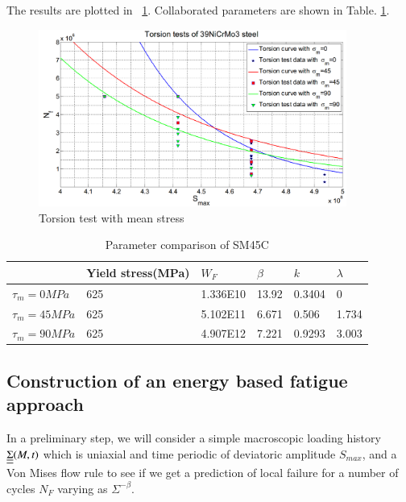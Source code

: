 \documentclass[3p,times,procedia,number]{elsarticle}
\newcommand{\figref}[1]{\figurename~\ref{#1}}
\begin{document}
The results are plotted in \figref{torsionSN}. Collaborated parameters are shown in Table. \ref{mean39NiCrMo3}.
\begin{figure}[h!]
	\centering
	\includegraphics[width=0.9\textwidth]{figures//torsionSN.png} 
	\caption{Torsion test with mean stress}
	\label{torsionSN}
\end{figure}
\begin{table}[]
	\centering
	\caption{Parameter comparison of SM45C}
	\label{mean39NiCrMo3}
	\begin{tabular}{l|lllll}
		\hline
		& \textbf{Yield stress(MPa)} & \textbf{$W_F$}                  & \textbf{$\beta$} & \textbf{$k$} & \textbf{$\lambda$} \\ \hline
		\textbf{$\tau_m=0MPa$}                         & 625                        & 1.336E10                        & 13.92            & 0.3404       & 0                 \\
		{\color[HTML]{333333} \textbf{$\tau_m=45MPa$}} & 625                        & {\color[HTML]{000000} 5.102E11} & 6.671            & 0.506        & 1.734             \\
		{\color[HTML]{333333} \textbf{$\tau_m=90MPa$}} & 625                        & 4.907E12                        & 7.221            & 0.9293       & 3.003             \\ \hline
	\end{tabular}
\end{table}

\subsection{Construction of an energy based fatigue approach}

In a preliminary step, we will consider a simple macroscopic loading history $\uline{\uline{\Sigma}}(M, t)$ which is uniaxial
and time periodic of deviatoric amplitude $S_{max}$, and a Von Mises flow rule to see if we get a prediction of local failure for a number of cycles $N_F$ varying as $\Sigma^{-\beta}.$
\end{document}
